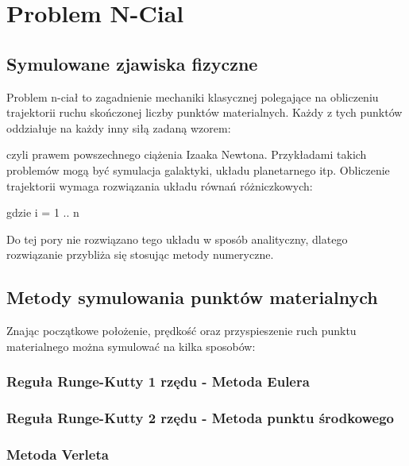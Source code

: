 
\section { Problem N-Cial }
\subsection {Symulowane zjawiska fizyczne}
Problem n-ciał to zagadnienie mechaniki klasycznej polegające na obliczeniu trajektorii ruchu skończonej liczby punktów materialnych. 
Każdy z tych punktów oddziałuje na każdy inny siłą zadaną wzorem:

\begin{center}
 
\end{center}

czyli prawem powszechnego ciążenia Izaaka Newtona.\linebreak
Przykładami takich problemów mogą być symulacja galaktyki, układu planetarnego itp.\linebreak
Obliczenie trajektorii wymaga rozwiązania układu równań różniczkowych:
\begin{center}
 gdzie i = 1 .. n 
\end{center}
Do tej pory nie rozwiązano tego układu w sposób analityczny, dlatego rozwiązanie przybliża się stosując metody numeryczne.

\subsection {Metody symulowania punktów materialnych}

Znając początkowe położenie, prędkość oraz przyspieszenie ruch punktu materialnego można symulować na kilka sposobów:

\subsubsection {Reguła Runge-Kutty 1 rzędu - Metoda Eulera}

\subsubsection {Reguła Runge-Kutty 2 rzędu - Metoda punktu środkowego}


\subsubsection {Metoda Verleta}

